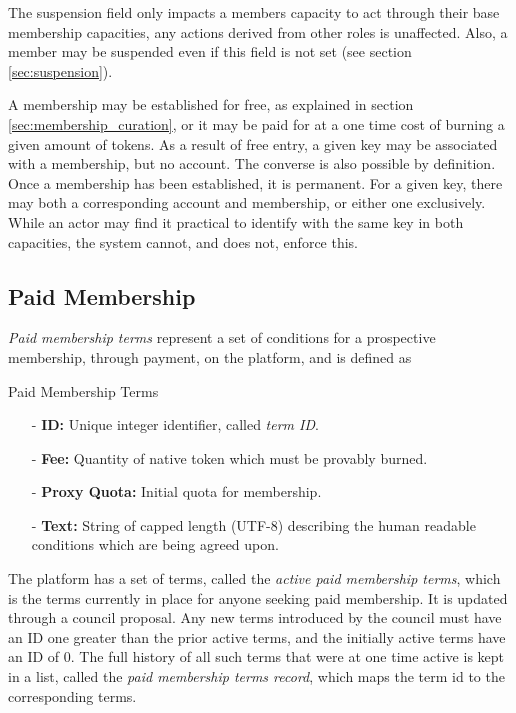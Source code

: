 \documentclass{article}
\newenvironment{concept_box}[1]
    {
    \begin{tcolorbox}
    {\large \textbf{#1} }
    }
    {
    \end{tcolorbox}
    }
\begin{document}
The suspension field only impacts a members capacity to act through their base membership capacities, any actions derived from other roles is unaffected. Also, a member may be suspended even if this field is not set (see section \ref{sec:suspension}).

A membership may be established for free, as explained in section \ref{sec:membership_curation}, or it may be paid for at a one time cost of burning a given amount of tokens. As a result of free entry, a given key may be associated with a membership, but no account. The converse is also possible by definition. Once a membership has been established, it is permanent. For a given key, there may both a corresponding account and membership, or either one exclusively. While an actor may find it practical to identify with the same key in both capacities, the system cannot, and does not, enforce this.


\subsection{Paid Membership} \label{sec:paid_membership}

\textit{Paid membership terms} represent a set of conditions for a prospective membership, through payment, on the platform, and is defined as\\

\begin{concept_box}{Paid Membership Terms}
    \begin{itemize}
      \item[-] \textbf{ID:} Unique integer identifier, called \textit{term ID}.
      \item[-] \textbf{Fee:} Quantity of native token which must be provably burned.
      \item[-] \textbf{Proxy Quota:} Initial quota for membership.
      \item[-] \textbf{Text:} String of capped length (UTF-8) describing the human readable conditions which are being agreed upon.
    \end{itemize}
\end{concept_box}

The platform has a set of terms, called the \textit{active paid membership terms}, which is the terms currently in place for anyone seeking paid membership. It is updated through a council proposal. Any new terms introduced by the council must have an ID one greater than the prior active terms, and the initially active terms have an ID of $0$. The full history of all such terms that were at one time active is kept in a list, called the \textit{paid membership terms record}, which maps the term id to the corresponding terms.
\end{document}
